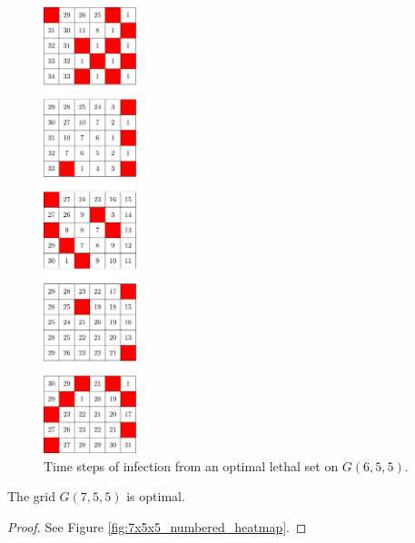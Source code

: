 \begin{figure}[H]
\centering
\includegraphics[width=0.24\textwidth]{figures/A/6x5x5_numbered_heatmap.pdf}
\caption{Time steps of infection from an optimal lethal set on $G(6,5,5)$.}
\label{fig:6x5x5_numbered_heatmap}
\end{figure}

\newpage

\begin{con}
\label{con:7x5x5}
The grid $G(7,5,5)$ is optimal.
\end{con}

\begin{proof}
See Figure \ref{fig:7x5x5_numbered_heatmap}.
\end{proof}

